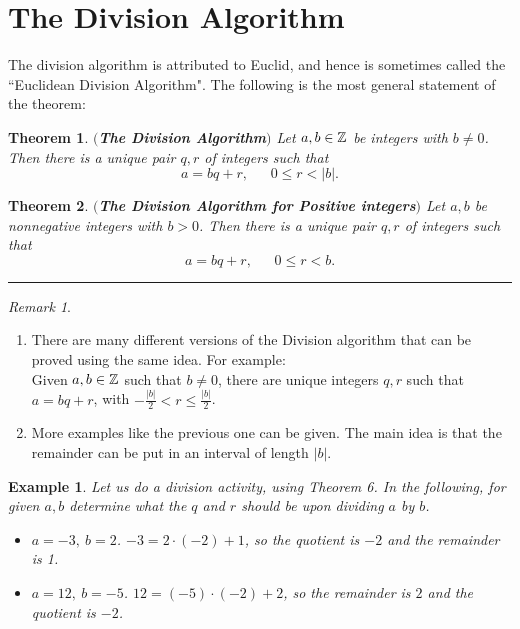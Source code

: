 \documentclass[12pt]{article}
\theoremstyle{plain}
\newtheorem{example}{Example}
\newtheorem{theorem}{Theorem}
\theoremstyle{definition}
\theoremstyle{remark}
\newtheorem{remark}{Remark}
\begin{document}
\section{The Division Algorithm}

The division algorithm is attributed to Euclid, and hence is sometimes called the ``Euclidean Division Algorithm". The following is the most general statement of the theorem:
\begin{theorem} {\bf $($The Division Algorithm$)$ }
Let $a, b \in \mathbb{Z}$ be integers with $b\neq 0$. Then there is a unique pair $q,r$ of integers such that
$$a=bq+r, \:\:\:\:\:\:\: 0\leq r<|b|.$$
\end{theorem}

\begin{theorem} {\bf $($The Division Algorithm for Positive integers$)$ }
Let $a, b$ be nonnegative integers with $b>0$. Then there is a unique pair $q,r$ of integers such that
$$a=bq+r, \:\:\:\:\:\:\: 0\leq r<b.$$
\end{theorem}

\hrule

\bigskip
\noindent

\begin{remark}
    \begin{enumerate}
        \item There are many different versions of the Division algorithm that can be proved using the same idea. For example:
        \\
        Given $a,b\in \mathbb{Z}$ such that $b\neq 0$, there are unique integers $q,r$ such that $a=bq+r$, with $-\frac{|b|}{2} < r\leq \frac{|b|}{2}$.
    \item More examples like the previous one can be given. The main idea is that the remainder can be put in an interval of length $|b|$.
    \end{enumerate}
\end{remark}

\begin{example}
    Let us do a division activity, using Theorem 6. In the following, for given $a, b$ determine what the $q$ and $r$ should be upon dividing $a$ by $b$.

\begin{itemize}
    \item $a=-3,\: b=2$. $-3=2\cdot (-2)+1$, so the quotient is $-2$ and the remainder is 1.
    \item $a=12,\: b=-5$.  $12 = (-5)\cdot (-2)+2$, so the remainder is $2$ and the quotient is $-2$.
\end{itemize}
\end{example}
\end{document}
